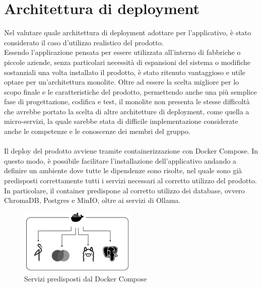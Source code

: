 \section{Architettura di deployment} \label{sec:archdeplo}
Nel valutare quale architettura di deployment adottare per l'applicativo, è stato considerato il caso d'utilizzo realistico del prodotto.\\
Essendo l'applicazione pensata per essere utilizzata all'interno di fabbriche o piccole aziende, senza particolari necessità di espansioni del sistema o modifiche sostanziali una volta installato il prodotto, è stato ritenuto vantaggioso e utile optare per un'architettura monolite. Oltre ad essere la scelta migliore per lo scopo finale e le caratteristiche del prodotto, permettendo anche una più semplice fase di progettazione, codifica e test, il  monolite non presenta le stesse difficoltà che avrebbe portato la scelta di altre architetture di deployment, come quella a micro-servizi, la quale sarebbe stata di difficile implementazione considerate anche le competenze e le conoscenze dei membri del gruppo.\\ \\
Il deploy del prodotto avviene tramite containerizzazione con Docker Compose. In questo modo, è possibile facilitare l'installazione dell'applicativo andando a definire un ambiente dove tutte le dipendenze sono risolte, nel quale sono già predisposti correttamente tutti i servizi necessari al corretto utilizzo del prodotto. In particolare, il container predispone al corretto utilizzo dei database, ovvero ChromaDB, Postgres e MinIO, oltre ai servizi di Ollama.

\vspace{2cm}

\begin{figure}[h!]
    \centering  
    \includegraphics[width=0.5\textwidth]{docker.png}
    \caption{Servizi predisposti dal Docker Compose}
\end{figure}

\newpage